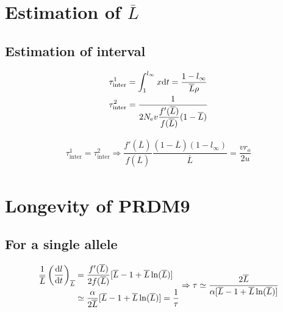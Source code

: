 \documentclass{article}
\begin{document}
\section{Estimation of $\overline{L}$}
\subsection{Estimation of interval}

\begin{equation}
  \begin{aligned}
    \tau_{\mathrm{inter}}^1 &= \int_{1}^{l_{\infty}} x \mathrm{d} t = \dfrac{1 - l_{\infty}}{\overline{L} \rho} \\
    \tau_{\mathrm{inter}}^2 &= \dfrac{1}{2 N_\mathrm{e} v \dfrac{f'(\overline{L})}{f(\overline{L})} (1-\overline{L})  }
  \end{aligned}
\end{equation}

\begin{equation}
  \begin{aligned}
    \tau_{\mathrm{inter}}^1 = \tau_{\mathrm{inter}}^2 \Rightarrow 
    \dfrac{f'(\overline{L})}{f(\overline{L})} \dfrac{(1- \overline{L})(1- l_{\infty})}{\overline{L}} = \dfrac{v r_o}{2 u}
  \end{aligned}
\end{equation}

\section{Longevity of PRDM9}
\subsection{For a single allele}

\begin{equation}
  \begin{aligned}
    \dfrac{1}{\overline{L}} \left( \dfrac{\mathrm{d}l}{\mathrm{d}t} \right)_{\overline{L}}
    &= \dfrac{f'(\overline{L})}{2 f(\overline{L})} [ \overline{L}-1 + \overline{L} \ln(\overline{L})] \\
    &\simeq \dfrac{\alpha}{2 \overline{L}}[\overline{L}-1 + \overline{L} \ln(\overline{L})] = \dfrac{1}{\tau} \\
  \end{aligned} \\
  \Rightarrow \tau \simeq \dfrac{2 \overline{L}}{\alpha[\overline{L}-1 + \overline{L} \ln(\overline{L})]}
\end{equation}


\end{document}

